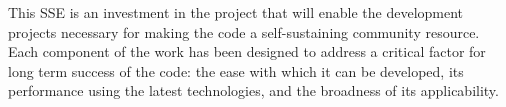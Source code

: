 This SSE is an investment in the \grackle{} project that will enable
the development projects necessary for making the code a
self-sustaining community resource.  Each component of the work has
been designed to address a critical factor for long term success of
the code: the ease with which it can be developed, its performance
using the latest technologies, and the broadness of its
applicability.
